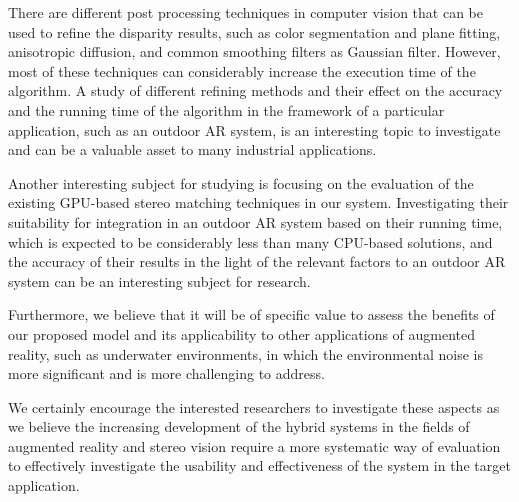 There are different post processing techniques in computer vision that can be used to refine the disparity results, such as color segmentation and plane fitting, 
anisotropic diffusion, and common smoothing filters as Gaussian filter. However, most of these techniques can considerably increase the execution time of the algorithm.
A study of different refining methods and their effect on the accuracy and the running time of the algorithm in the framework of a particular application, 
such as an outdoor AR system, is an interesting topic to investigate and can be a valuable asset to many industrial applications.

Another interesting subject for studying is focusing on the evaluation of the existing GPU-based stereo matching techniques in our system.
Investigating their suitability for integration in an outdoor AR system based on their running time, which is expected to be considerably less 
than many CPU-based solutions, 
and the accuracy of their results in the light of the relevant factors to an outdoor AR system can be an interesting subject for research.

Furthermore, we believe that it will be of specific value to
assess the benefits of our proposed model and its applicability to other applications of augmented reality, such as underwater environments, in which the environmental 
noise is more significant and is more challenging to address. 

We certainly encourage the 
interested researchers to investigate these aspects as we believe the increasing development of the hybrid systems in the fields of augmented reality and stereo vision 
require a more systematic way of evaluation to effectively investigate the usability and effectiveness of the system in the target application.



